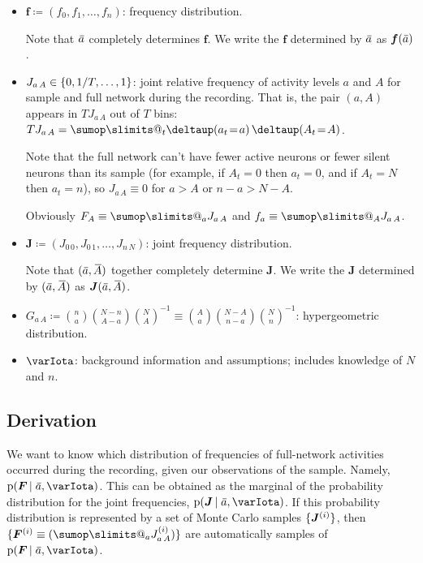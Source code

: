 \documentclass[\ifafour a4paper,12pt,\else a5paper,10pt,\fi%
onecolumn,oneside,article,%
british%
]{memoir}
\makeatletter
\theoremstyle{remark}
\theoremstyle{innote}
\def\sum{\DOTSI\sumop\slimits@}
\newcommand*{\delt}{\deltaup}%
\newcommand*{\defd}{\coloneqq}
\DeclarePairedDelimiter\set{\{}{\}}
\newcommand*{\pf}{\mathrm{p}}%
\renewcommand*{\|}[1][]{\nonscript\,#1\vert\nonscript\;\mathopen{}}
\newcommand*{\widebar}[1]{{\mkern1.5mu\skew{2}\overline{\mkern-1.5mu#1\mkern-1.5mu}\mkern 1.5mu}}
\newcommand*{\yFF}{F}
\newcommand*{\yff}{f}
\newcommand*{\yF}{\bm{\yFF}}
\newcommand*{\yf}{\bm{\yff}}
\newcommand*{\yAs}{\widebar{A}}%
\newcommand*{\yas}{\widebar{a}}%
\newcommand*{\yI}{\varIota}
\newcommand*{\yJJ}{J}
\newcommand*{\yJ}{\bm{\yJJ}}
\newcommand*{\yeq}{\mathrel{\!=\!}}
\makeatother
\begin{document}
\begin{itemize}[wide,label={}]
\item $\yf \defd (f_{0},f_{1}, \dotsc,f_{n})$: frequency distribution.

  Note that $\yas$ completely determines $\yf$.  We write the $\yf$
  determined by $\yas$ as $\yf(\yas)$.

  
\item $J_{a\,A} \in \set{0,1/T,\dotsc,1}$: joint relative frequency of
  activity levels $a$ and $A$ for sample and full network during the
  recording. That is, the pair $(a,A)$ appears in $T J_{a\,A}$ out of $T$
  bins:
  $T J_{a\,A} = \sum_{t}\delt(a_{t} \yeq  a)\, \delt(A_{t}
  \yeq  A)$.

  Note that the full network can't have fewer active neurons or fewer
  silent neurons than its sample (for example, if $A_{t}=0$ then
  $a_{t}=0$, and if $A_{t}=N$ then $a_{t}=n$), so $J_{a\,A}\equiv 0$ for
  $a>A$ or $n-a>N-A$.

  Obviously $F_{A}\equiv\sum_{a}J_{a\,A}$ and $f_{a}\equiv\sum_{A}J_{a\,A}$.

\item $\yJ \defd (J_{0\,0},J_{0\,1}, \dotsc,J_{n\,N})$: joint frequency
  distribution.

  Note that $(\yas,\yAs)$ together completely determine $\yJ$.  We write the $\yJ$
  determined by $(\yas,\yAs)$ as $\yJ(\yas,\yAs)$.

\item
  $G_{a\,A} \defd 
  \binom{n}{a}\binom{N-n}{A-a}\binom{N}{A}^{-1} \equiv
  \binom{A}{a}\binom{N-A}{n-a}\binom{N}{n}^{-1}$: hypergeometric
  distribution.
  
\item $\yI$: background information and assumptions; includes knowledge of
  $N$ and $n$.
\end{itemize}

\subsection{Derivation}
\label{sec:derivation_steps}

We want to know which distribution of frequencies of full-network
activities occurred during the recording, given our observations of the
sample. Namely, $\pf(\yF \| \yas,\yI)$. This can be obtained as the
marginal of the probability distribution for the joint frequencies,
$\pf(\yJ \| \yas, \yI)$. If this probability distribution is represented by
a set of Monte Carlo samples $\set{\yJ^{(i)}}$, then
$\set{\yF^{(i)}\equiv (\sum_{a}J^{(i)}_{a\,A})}$ are automatically samples
of $\pf(\yF \| \yas,\yI)$.
\end{document}
